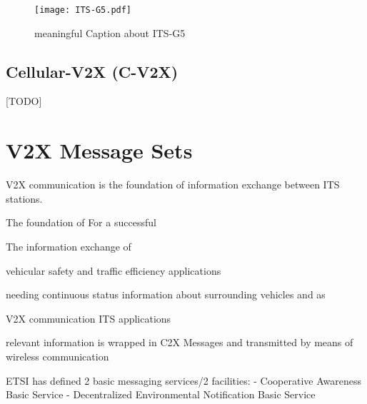 

\begin{figure}[H]
    \centering
    \texttt{[image: ITS-G5.pdf]}
    \caption{meaningful Caption about ITS-G5}
    \label{fig:iso-its-g5}
\end{figure}




\subsection{Cellular-V2X (C-V2X)}
[TODO]


\newpage

\section{V2X Message Sets}

V2X communication is the foundation of information exchange between ITS stations.


The foundation of 
For a successful

The information exchange of 


vehicular safety and traffic efficiency applications

needing continuous status information about surrounding vehicles and as



V2X communication
ITS applications

relevant information is wrapped in C2X Messages and transmitted by means of wireless communication


ETSI has defined 2 basic messaging services/2 facilities:
    - Cooperative Awareness Basic Service
    - Decentralized Environmental Notification Basic Service
    
